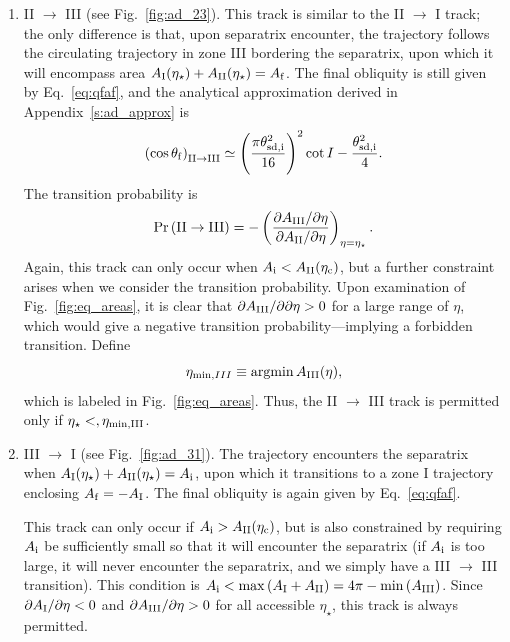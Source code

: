 \documentclass[
        fleqn,
        usenatbib,
    ]{mnras}
\newcommand*{\pdil}[2]{\partial#1 / \partial#2}
\newcommand*{\p}[1]{\left(#1\right)}
\DeclareMathOperator*{\argmin}{argmin}
\begin{document}
\begin{enumerate}
    \item II $\to$ III (see Fig.~\ref{fig:ad_23}). This track is similar to the
        II $\to$ I track; the only difference is that, upon separatrix
        encounter, the trajectory follows the circulating trajectory in zone III
        bordering the separatrix, upon which it will encompass area $A_{\rm
        I}(\eta_\star) + A_{\rm II}(\eta_\star) = A_{\rm f}$. The final
        obliquity is still given by Eq.~\eqref{eq:qfaf}, and the analytical
        approximation derived in Appendix~\ref{s:ad_approx} is
        \begin{equation}
            \p{\cos \theta_{\rm f}}_{\rm II \to III} \simeq
                \p{\frac{\pi \theta_{\rm sd, i}^2}{16}}^2 \cot I
                    - \frac{\theta_{\rm sd, i}^2}{4}.\label{eq:qf_23_approx}
        \end{equation}
        The transition probability is
        \begin{equation}
            \Pr\p{\mathrm{II} \to \mathrm{III}} = -\p{
                \frac{\pdil{A_{\rm III}}{\eta}}{\pdil{A_{\rm II}}{\eta}}}
                    _{\eta = \eta_{\star}}.
        \end{equation}
        Again, this track can only occur when $A_{\rm i} < A_{\rm II}(\eta_{\rm
        c})$, but a further constraint arises when we consider the transition
        probability. Upon examination of Fig.~\ref{fig:eq_areas}, it is clear
        that $\pdil{A_{\rm III}}{\partial \eta} > 0$ for a large range of
        $\eta$, which would give a negative transition probability---implying
        a forbidden transition. Define
        \begin{equation}
            \eta_{\min, III} \equiv \argmin A_{\rm III}(\eta)
                \label{eq:eta_minIII},
        \end{equation}
        which is labeled in Fig.~\ref{fig:eq_areas}. Thus, the II $\to$ III
        track is permitted only if $\eta_\star <, \eta_{\rm \min, III}$.

    \item III $\to$ I (see Fig.~\ref{fig:ad_31}). The trajectory encounters the
        separatrix when $A_{\rm I}(\eta_\star) + A_{\rm II}(\eta_\star) =
        A_{\rm i}$, upon which it transitions to a zone I trajectory enclosing
        $A_{\rm f} = -A_{\rm I}$. The final obliquity is again given by
        Eq.~\eqref{eq:qfaf}.

        This track can only occur if $A_{\rm i} > A_{\rm II}(\eta_{\rm c})$,
        but is also constrained by requiring $A_{\rm i}$ be sufficiently small
        so that it will encounter the separatrix (if $A_{\rm i}$ is too large,
        it will never encounter the separatrix, and we simply have a III $\to$
        III transition). This condition is $A_{\rm i} < \max \p{A_{\rm I} +
        A_{\rm II}} = 4\pi - \min \p{A_{\rm III}}$.
        Since $\pdil{A_{\rm I}}{\eta} < 0$ and $\pdil{A_{\rm III}}{\eta} > 0$
        for all accessible $\eta_{\star}$, this track is always permitted.


\end{enumerate}
\end{document}
